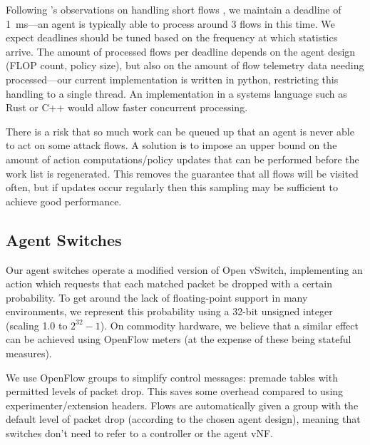 \documentclass[10pt, times, conference, letterpaper]{IEEEtran}
\begin{document}
Following \citeauthor{DBLP:conf/sigcomm/ChenL0L18}'s observations on handling short flows \cite{DBLP:conf/sigcomm/ChenL0L18}, we maintain a deadline of \SI{1}{\milli\second}---an agent is typically able to process around 3 flows in this time.
We expect deadlines should be tuned based on the frequency at which statistics arrive.
The amount of processed flows per deadline depends on the agent design (FLOP count, policy size), but also on the amount of flow telemetry data needing processed---our current implementation is written in python, restricting this handling to a single thread.
An implementation in a systems language such as Rust or C++ would allow faster concurrent processing.

There is a risk that so much work can be queued up that an agent is never able to act on some attack flows.
A solution is to impose an upper bound on the amount of action computations/policy updates that can be performed before the work list is regenerated.
This removes the guarantee that all flows will be visited often, but if updates occur regularly then this sampling may be sufficient to achieve good performance.

\subsection{Agent Switches}
Our agent switches operate a modified version of Open vSwitch, implementing an action which requests that each matched packet be dropped with a certain probability.
To get around the lack of floating-point support in many environments, we represent this probability using a 32-bit unsigned integer (scaling \num{1.0} to $2^{32}-1$).
On commodity hardware, we believe that a similar effect can be achieved using OpenFlow meters (at the expense of these being stateful measures).

We use OpenFlow groups to simplify control messages: premade tables with permitted levels of packet drop.
This saves some overhead compared to using experimenter/extension headers.
Flows are automatically given a group with the default level of packet drop (according to the chosen agent design), meaning that switches don't need to refer to a controller or the agent vNF.

\end{document}
